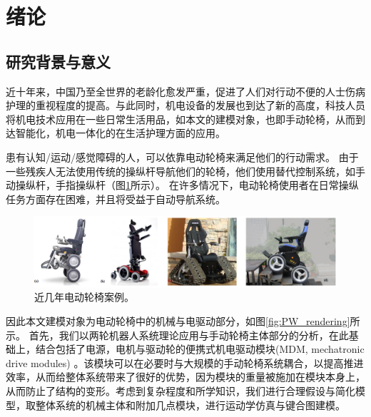 \newpage
\setcounter{page}{1}
\cfoot{\thepage}

\section{绪论}
\subsection{研究背景与意义}

近十年来，中国乃至全世界的老龄化愈发严重，促进了人们对行动不便的人士伤病护理的重视程度的提高。与此同时，机电设备的发展也到达了新的高度，科技人员将机电技术应用在一些日常生活用品，如本文的建模对象，也即手动轮椅，从而到达智能化，机电一体化的在生活护理方面的应用。

患有认知/运动/感觉障碍的人，可以依靠电动轮椅来满足他们的行动需求。 由于一些残疾人无法使用传统的操纵杆导航他们的轮椅，他们使用替代控制系统，如手动操纵杆，手指操纵杆（图\ref{fig:smart_wheel_chairs}所示）。 在许多情况下，电动轮椅使用者在日常操纵任务方面存在困难，并且将受益于自动导航系统。

\begin{figure}[!h]
	\centering
	\includegraphics[width=1\textwidth]{fig/smart_wheel_chairs.png}
	\caption{近几年电动轮椅案例。}\label{fig:smart_wheel_chairs}
\end{figure}

因此本文建模对象为电动轮椅中的机械与电驱动部分，如图\ref{fig:PW_rendering}所示。
首先，我们以两轮机器人系统理论应用与手动轮椅主体部分的分析，在此基础上，结合包括了电源，电机与驱动轮的便携式机电驱动模块(MDM, mechatronic drive modules) 。该模块可以在必要时与大规模的手动轮椅系统耦合，以提高推进效率，从而给整体系统带来了很好的优势，因为模块的重量被施加在模块本身上，从而防止了结构的变形。考虑到复杂程度和所学知识，我们进行合理假设与简化模型，取整体系统的机械主体和附加几点模块，进行运动学仿真与键合图建模。

